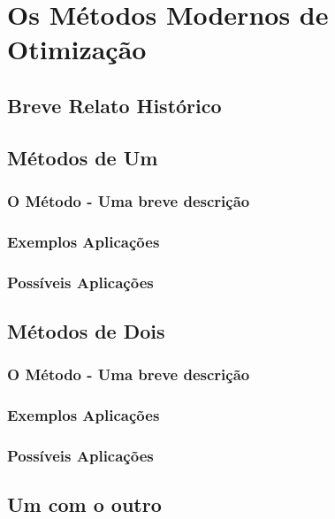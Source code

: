 

\chapter{\Large{Os Métodos Modernos de Otimização}} \label{chp:3}


\section{Breve Relato Histórico}

\hspace{0.8cm} 

\section{{Métodos de Um}}

\hspace{0.8cm} 

\subsection{O Método - Uma breve descrição}

\subsection{Exemplos Aplicações}

\subsection{Possíveis Aplicações}


\section{{Métodos de Dois}}

\hspace{0.8cm} 

\subsection{O Método - Uma breve descrição}

\subsection{Exemplos Aplicações}

\subsection{Possíveis Aplicações}

\textcolor[rgb]{1,0,0}{\section{{Um com o outro}}}

